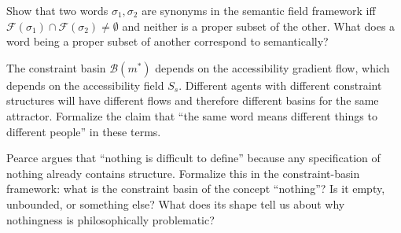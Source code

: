 \begin{exercise}
  Show that two words $\sigma_1, \sigma_2$ are synonyms in the
  semantic field framework iff $\mathcal{F}(\sigma_1) \cap
  \mathcal{F}(\sigma_2) \neq \emptyset$ and neither is a proper
  subset of the other. What does a word being a proper subset of
  another correspond to semantically?
\end{exercise}

\begin{exercise}
  The constraint basin $\mathcal{B}(m^*)$ depends on the accessibility
  gradient flow, which depends on the accessibility field $S_s$.
  Different agents with different constraint structures will have
  different flows and therefore different basins for the same attractor.
  Formalize the claim that ``the same word means different things
  to different people'' in these terms.
\end{exercise}

\begin{exercise}[title={Connecting frameworks}]
  Pearce argues that ``nothing is difficult to define'' because any
  specification of nothing already contains structure. Formalize this
  in the constraint-basin framework: what is the constraint basin of
  the concept ``nothing''? Is it empty, unbounded, or something else?
  What does its shape tell us about why nothingness is philosophically
  problematic?
\end{exercise}
